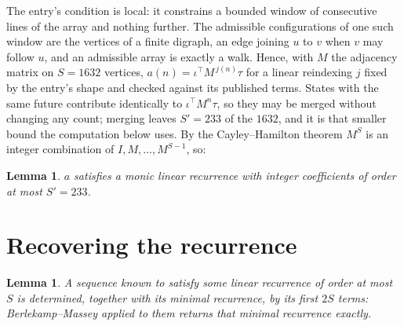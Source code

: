 \documentclass[11pt,a4paper]{article}
\theoremstyle{plain}
\newtheorem{lemma}[theorem]{Lemma}
\theoremstyle{definition}
\begin{document}
The entry's condition is local: it constrains a bounded window of consecutive lines of the
array and nothing further. The admissible configurations of one such window are the vertices
of a finite digraph, an edge joining $u$ to $v$ when $v$ may follow $u$, and an admissible
array is exactly a walk. Hence, with $M$ the adjacency matrix on $S=1632$ vertices,
$a(n)=\iota^{\!\top}M^{\,j(n)}\tau$ for a linear reindexing $j$ fixed by the entry's shape
and checked against its published terms. States with the same future contribute identically to $\iota^{\!\top}M^n\tau$, so they may be merged without changing any count; merging leaves $S'=233$ of the $1632$, and it is that smaller bound the computation below uses. By the Cayley--Hamilton theorem $M^{S}$ is an
integer combination of $I,M,\dots,M^{S-1}$, so:

\begin{lemma}\label{lem:cf}
$a$ satisfies a monic linear recurrence with integer coefficients of order at most
$S'=233$.
\end{lemma}

\section{Recovering the recurrence}

\begin{lemma}\label{lem:bm}
A sequence known to satisfy some linear recurrence of order at most $S$ is determined, together
with its minimal recurrence, by its first $2S$ terms: Berlekamp--Massey applied to them returns
that minimal recurrence exactly.
\end{lemma}
\end{document}

